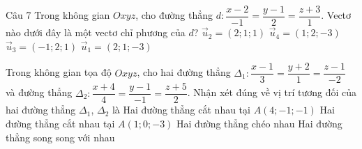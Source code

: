 \begin{ex}Câu 7%
Trong không gian $Oxyz$, cho đường thẳng $d \colon \dfrac{x-2}{-1}=\dfrac{y-1}{2}=\dfrac{z+3}{1}$. Vectơ nào dưới đây là một vectơ chỉ phương của $d$?
\choice
{$\overrightarrow{u}_2=(2;1;1)$}
{$\overrightarrow{u}_4=(1;2;-3)$}
{\True $\overrightarrow{u}_3=(-1;2;1)$}
{$\overrightarrow{u}_1=(2;1;-3)$}
\end{ex}

\begin{ex}%
Trong không gian tọa độ $Oxyz$, cho hai đường thẳng $\Delta_1\colon \dfrac{x-1}{3}=\dfrac{y+2}{1}=\dfrac{z-1}{-2}$ và đường thẳng $\Delta_2\colon \dfrac{x+4}{4}=\dfrac{y-1}{-1}=\dfrac{z+5}{2}$. Nhận xét đúng về vị trí tương đối của hai đường thẳng $\Delta_1$, $\Delta_2$ là
\choice
{\True Hai đường thẳng cắt nhau tại $A(4;-1;-1)$}
{Hai đường thẳng cắt nhau tại $A(1;0;-3)$}
{Hai đường thẳng chéo nhau}
{Hai đường thẳng song song với nhau}
\end{ex}

